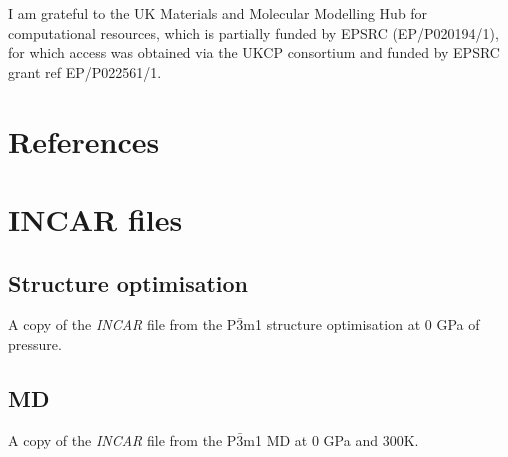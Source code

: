 \documentclass[a4paper,12pt]{article}
\begin{document}
I am grateful to the UK Materials and Molecular Modelling Hub for computational resources, which is partially funded by EPSRC (EP/P020194/1), for which access was obtained via the UKCP consortium and funded by EPSRC grant ref EP/P022561/1.

\section{References}
%
%
\printbibliography[heading=none]


\appendix
\section{INCAR files}
%
%

\subsection*{Structure optimisation}
A copy of the \textit{INCAR} file from the P$\bar{3}$m1 structure optimisation at 0 GPa of pressure.


\subsection*{MD}
A copy of the \textit{INCAR} file from the P$\bar{3}$m1 MD at 0 GPa and 300K.

\end{document}
